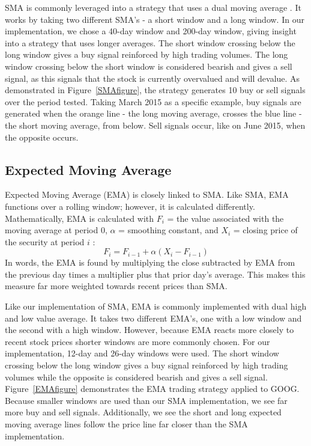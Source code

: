 \documentclass[letterpaper,11pt]{article}
\begin{document}
SMA is commonly leveraged into a strategy that uses a dual moving average \cite{AlmeidaTeixeira}. It works by taking two different SMA's - a short window and a long window. In our implementation, we chose a 40-day window and 200-day window, giving insight into a strategy that uses longer averages. The short window crossing below the long window gives a buy signal reinforced by high trading volumes. The long window crossing below the short window is considered bearish and gives a sell signal, as this signals that the stock is currently overvalued and will devalue. As demonstrated in Figure~\ref{SMAfigure}, the strategy generates 10 buy or sell signals over the period tested. Taking March 2015 as a specific example, buy signals are generated when the orange line - the long moving average, crosses the blue line - the short moving average, from below. Sell signals occur, like on June 2015, when the opposite occurs.

\subsection{Expected Moving Average}

Expected Moving Average (EMA) is closely linked to SMA. Like SMA, EMA functions over a rolling window; however, it is calculated differently. Mathematically, EMA is calculated with $F_i$ = the value associated with the moving average at period 0, $\alpha$ = smoothing constant, and $X_i$ = closing price of the security at period $i$ \cite{James1968}:  \[F_i = F_{i-1} +\alpha(X_i - F_{i-1})\]  In words, the EMA is found by multiplying the close subtracted by EMA from the previous day times a multiplier plus that prior day's average. This makes this measure far more weighted towards recent prices than SMA.

Like our implementation of SMA, EMA is commonly implemented with dual high and low value average. It takes two different EMA's, one with a low window and the second with a high window. However, because EMA reacts more closely to recent stock prices shorter windows are more commonly chosen. For our implementation, 12-day and 26-day windows were used. The short window crossing below the long window gives a buy signal reinforced by high trading volumes while the opposite is considered bearish and gives a sell signal. Figure~\ref{EMAfigure} demonstrates the EMA trading strategy applied to GOOG. Because smaller windows are used than our SMA implementation, we see far more buy and sell signals. Additionally, we see the short and long expected moving average lines follow the price line far closer than the SMA implementation.
\end{document}
